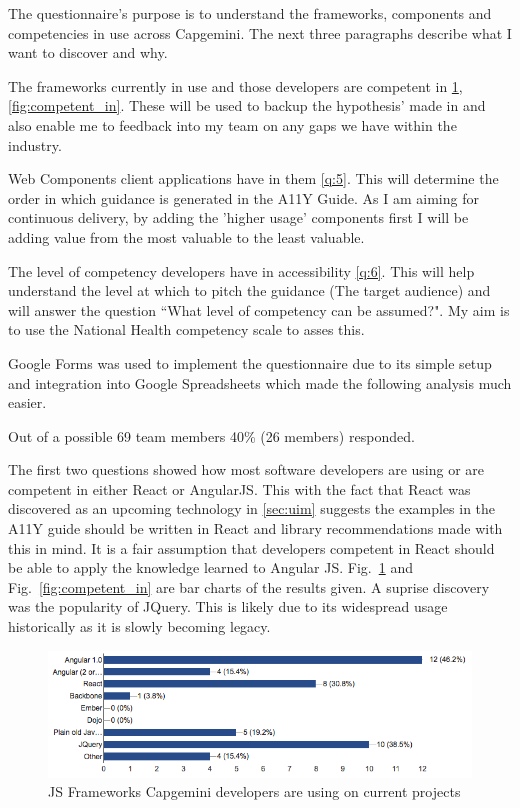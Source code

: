 The questionnaire's purpose is to understand the frameworks, components and
competencies in use across Capgemini. The next three paragraphs describe what
I want to discover and why.

The frameworks currently in use and those developers are competent in
\ref{fig:current_proj}, \ref{fig:competent_in}. These will be used to backup the hypothesis' made in
\label{sec:uim} and also enable me to feedback into my team on any gaps we
have within the industry.

Web Components client applications have in them \ref{q:5}. This will
determine the order in which guidance is generated in the A11Y Guide.
As I am aiming for continuous delivery, by adding the 'higher usage'
components first I will be adding value from the most valuable to the least
valuable.

The level of competency developers have in accessibility \ref{q:6}. This will
help understand the level at which to pitch the guidance (The target audience)
and will answer the question ``What level of competency can be assumed?". My
aim is to use the National Health competency scale \citep{NHComptency} to
asses this.

Google Forms was used to implement the questionnaire due to its simple
setup and integration into Google Spreadsheets which made the following
analysis much easier.

Out of a possible 69 team members 40\% (26 members) responded.

The first two questions showed how most software developers are using or are
competent in either React or AngularJS. This with the fact that
React was discovered as an upcoming technology in \ref{sec:uim} suggests the
examples in the A11Y guide should be written in React and library
recommendations made with this in mind. It is a fair assumption that
developers competent in React should be able to apply the knowledge learned
to Angular JS. Fig.~\ref{fig:current_proj} and Fig.~\ref{fig:competent_in}
are bar charts of the results given. A suprise discovery was the popularity
of JQuery. This is likely due to its widespread usage historically as it is
slowly becoming legacy.

\begin{figure}[H]
\centering
\centering
\includegraphics[width=\textwidth]{figures/questions/frameworks_in_use}
\captionsetup{justification=centering}
\caption{JS Frameworks Capgemini developers are using on current projects
\label{fig:current_proj}}
\end{figure}


